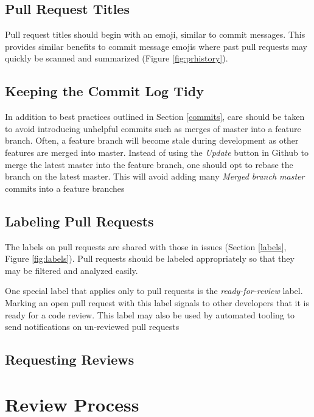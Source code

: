 \documentclass[a4paper,12pt,titlepage]{scrartcl}
\begin{document}
	\subsection{Pull Request Titles}
	
	Pull request titles should begin with an emoji, similar to commit messages.
	This provides similar benefits to commit message emojis where past pull requests may quickly be scanned and summarized (Figure \ref{fig:prhistory}).
	
	\subsection{Keeping the Commit Log Tidy}
	
	In addition to best practices outlined in Section \ref{commits}, care should be taken to avoid introducing unhelpful commits such as merges of master into a feature branch.
	Often, a feature branch will become stale during development as other features are merged into master.
	Instead of using the {\em Update} button in Github to merge the latest master into the feature branch, one should opt to rebase the branch on the latest master.
	This will avoid adding many {\em Merged branch master} commits into a feature branches 
	
	\subsection{Labeling Pull Requests}
	
	The labels on pull requests are shared with those in issues (Section \ref{labels}, Figure \ref{fig:labels}).
	Pull requests should be labeled appropriately so that they may be filtered and analyzed easily.
	
	One special label that applies only to pull requests is the {\em ready-for-review} label.
	Marking an open pull request with this label signals to other developers that it is ready for a code review.
	This label may also be used by automated tooling to send notifications on un-reviewed pull requests
	
	\subsection{Requesting Reviews}
   
	\section{Review Process}
	
\end{document}
